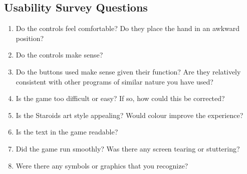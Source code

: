 \documentclass[12pt, titlepage]{article}
\begin{document}
\subsection{Usability Survey Questions}
\label{interview:questions}

\begin{enumerate}

  \item Do the controls feel comfortable? Do they place the hand in an awkward position?
  \item Do the controls make sense?
  \item Do the buttons used make sense given their function? Are they relatively consistent with other programs of similar nature you have used?
  \item Is the game too difficult or easy? If so, how could this be corrected?
  \item Is the Staroids art style appealing? Would colour improve the experience?
  \item Is the text in the game readable?
  \item Did the game run smoothly? Was there any screen tearing or stuttering?
  \item Were there any symbols or graphics that you recognize?

\end{enumerate}
\end{document}
